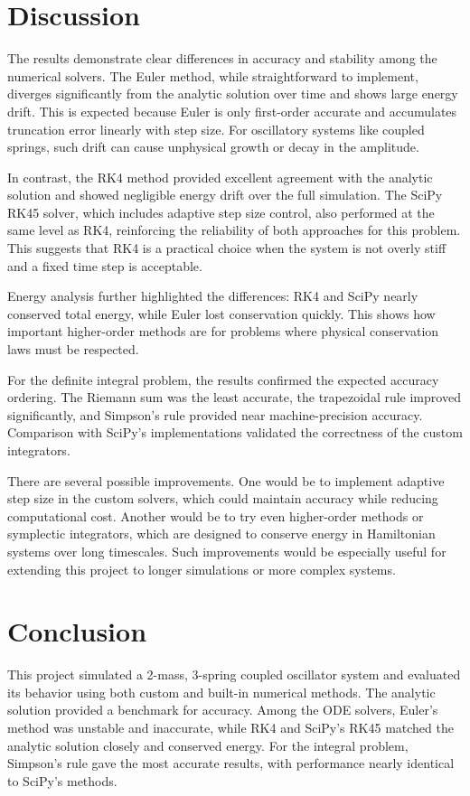 \documentclass[12pt]{article}
\begin{document}
\section{Discussion}

The results demonstrate clear differences in accuracy and stability among the numerical solvers. The Euler method, while straightforward to implement, diverges significantly from the analytic solution over time and shows large energy drift. This is expected because Euler is only first-order accurate and accumulates truncation error linearly with step size. For oscillatory systems like coupled springs, such drift can cause unphysical growth or decay in the amplitude. 

In contrast, the RK4 method provided excellent agreement with the analytic solution and showed negligible energy drift over the full simulation. The SciPy RK45 solver, which includes adaptive step size control, also performed at the same level as RK4, reinforcing the reliability of both approaches for this problem. This suggests that RK4 is a practical choice when the system is not overly stiff and a fixed time step is acceptable.

Energy analysis further highlighted the differences: RK4 and SciPy nearly conserved total energy, while Euler lost conservation quickly. This shows how important higher-order methods are for problems where physical conservation laws must be respected.

For the definite integral problem, the results confirmed the expected accuracy ordering. The Riemann sum was the least accurate, the trapezoidal rule improved significantly, and Simpson's rule provided near machine-precision accuracy. Comparison with SciPy's implementations validated the correctness of the custom integrators. 

There are several possible improvements. One would be to implement adaptive step size in the custom solvers, which could maintain accuracy while reducing computational cost. Another would be to try even higher-order methods or symplectic integrators, which are designed to conserve energy in Hamiltonian systems over long timescales. Such improvements would be especially useful for extending this project to longer simulations or more complex systems.


\section{Conclusion}

This project simulated a 2-mass, 3-spring coupled oscillator system and evaluated its behavior using both custom and built-in numerical methods. The analytic solution provided a benchmark for accuracy. Among the ODE solvers, Euler's method was unstable and inaccurate, while RK4 and SciPy's RK45 matched the analytic solution closely and conserved energy. For the integral problem, Simpson's rule gave the most accurate results, with performance nearly identical to SciPy's methods. 
\end{document}
